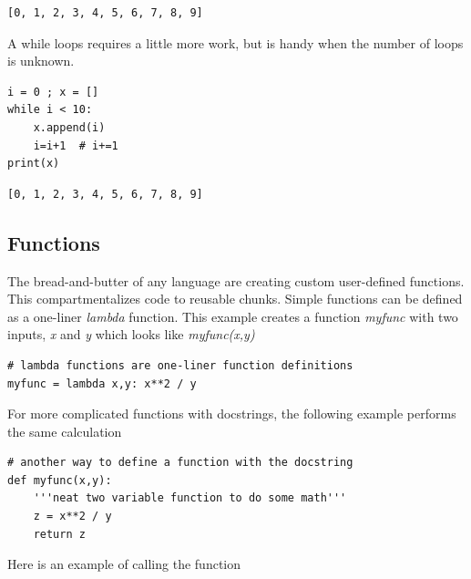 \documentclass[%
oneside,                 %
final,                   %
10pt]{article}
\begin{document}
\begin{verbatim}
[0, 1, 2, 3, 4, 5, 6, 7, 8, 9]
\end{verbatim}

A while loops requires a little more work, but is handy when the number of loops is unknown.

\begin{verbatim}
i = 0 ; x = []
while i < 10:
    x.append(i)
    i=i+1  # i+=1
print(x)
\end{verbatim}

\begin{verbatim}
[0, 1, 2, 3, 4, 5, 6, 7, 8, 9]
\end{verbatim}

\subsection{Functions}

The bread-and-butter of any language are creating custom user-defined functions. This compartmentalizes code to reusable chunks. Simple functions can be defined as a one-liner \emph{lambda} function. This example creates a function \emph{myfunc} with two inputs, \emph{x} and \emph{y} which looks like  \emph{myfunc(x,y)}

\begin{verbatim}
# lambda functions are one-liner function definitions
myfunc = lambda x,y: x**2 / y
\end{verbatim}

For more complicated functions with docstrings, the following example performs the same calculation

\begin{verbatim}
# another way to define a function with the docstring
def myfunc(x,y):
    '''neat two variable function to do some math'''
    z = x**2 / y
    return z
\end{verbatim}

Here is an example of calling the function
\end{document}
